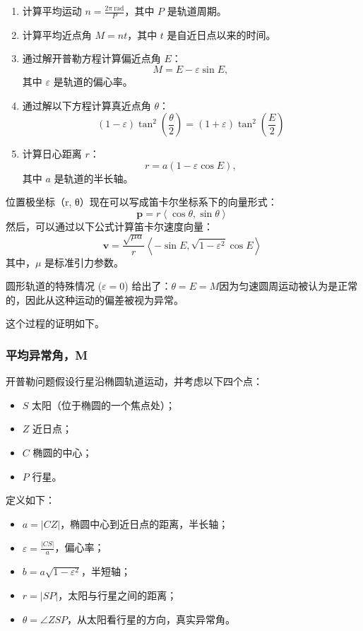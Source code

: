 \begin{enumerate}
\item 计算平均运动 \(n = \frac{2\pi \ \text{rad}}{P}\)，其中 \(P\) 是轨道周期。
\item 计算平均近点角 \(M = nt\)，其中 \(t\) 是自近日点以来的时间。
\item 通过解开普勒方程计算偏近点角 \(E\)：
   \[
   M = E - \varepsilon \sin E,~
   \]
   其中 \(\varepsilon\) 是轨道的偏心率。
\item 通过解以下方程计算真近点角 \(\theta\)：
   \[
   (1 - \varepsilon) \tan^2 \left( \frac{\theta}{2} \right) = (1 + \varepsilon) \tan^2 \left( \frac{E}{2} \right)~
   \]
\item 计算日心距离 \(r\)：
   \[
   r = a(1 - \varepsilon \cos E),~
   \]
   其中 \(a\) 是轨道的半长轴。
\end{enumerate}
位置极坐标（r, θ）现在可以写成笛卡尔坐标系下的向量形式：
\[
\mathbf{p} = r \left\langle \cos \theta, \sin \theta \right\rangle~
\]
然后，可以通过以下公式计算笛卡尔速度向量：
\[
\mathbf{v} = \frac{\sqrt{\mu a}}{r} \left\langle -\sin E, \sqrt{1 - \varepsilon^2} \cos E \right\rangle~
\]
其中，\(\mu\) 是标准引力参数。

圆形轨道的特殊情况 (\(\varepsilon = 0\)) 给出了：\(\theta = E = M\)因为匀速圆周运动被认为是正常的，因此从这种运动的偏差被视为异常。

这个过程的证明如下。
\subsubsection{平均异常角，M}
开普勒问题假设行星沿椭圆轨道运动，并考虑以下四个点：
\begin{itemize}
\item \(S\) 太阳（位于椭圆的一个焦点处）；
\item \(Z\) 近日点；
\item \(C\) 椭圆的中心；
\item \(P\) 行星。
\end{itemize}
定义如下：
\begin{itemize}
\item \( a = |CZ| \)，椭圆中心到近日点的距离，半长轴；
\item \( \varepsilon = \frac{|CS|}{a} \)，偏心率；
\item \( b = a \sqrt{1 - \varepsilon^2} \)，半短轴；
\item \( r = |SP| \)，太阳与行星之间的距离；
\item  \( \theta = \angle ZSP \)，从太阳看行星的方向，真实异常角。
\end{itemize}

